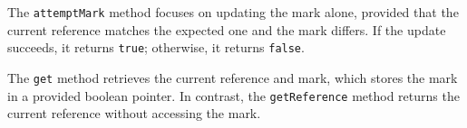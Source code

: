 The \texttt{attemptMark} method focuses on updating the mark alone, provided that the current reference matches the expected one and the mark differs. If the update succeeds, it returns \texttt{true}; otherwise, it returns \texttt{false}.

The \texttt{get} method retrieves the current reference and mark, which stores the mark in a provided boolean pointer. In contrast, the \texttt{getReference} method returns the current reference without accessing the mark.

\begin{figure}[!p]
    \centering
    
\end{figure}